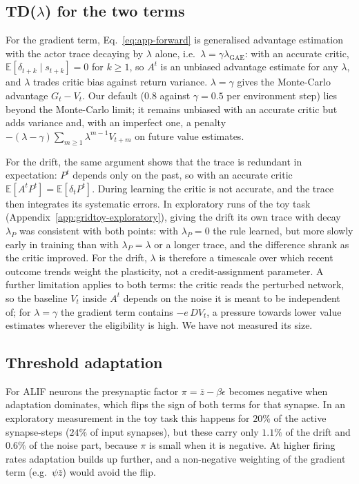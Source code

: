 \documentclass[10pt,twocolumn]{article}
\begin{document}
\subsection{TD(\texorpdfstring{$\lambda$}{lambda}) for the two terms}
\label{app:decomp-lambda}
For the gradient term, Eq.~\eqref{eq:app-forward} is generalised advantage
estimation~\citep{schulman2016gae} with the actor trace decaying by $\lambda$
alone, i.e.\ $\lambda=\gamma\lambda_{\mathrm{GAE}}$: with an accurate critic,
$\mathbb{E}[\delta_{t+k}\mid s_{t+k}]=0$ for $k\ge1$, so $A^t$ is an unbiased
advantage estimate for any $\lambda$, and $\lambda$ trades critic bias against
return variance. $\lambda=\gamma$ gives the Monte-Carlo advantage $G_t-V_t$. Our
default ($0.8$ against $\gamma=0.5$ per environment step) lies beyond the
Monte-Carlo limit; it remains unbiased with an accurate critic but adds variance
and, with an imperfect one, a penalty $-(\lambda-\gamma)\sum_{m\ge1}\lambda^{m-1}V_{t+m}$
on future value estimates.

For the drift, the same argument shows that the trace is redundant in
expectation: $P^t$ depends only on the past, so with an accurate critic
$\mathbb{E}[A^tP^t]=\mathbb{E}[\delta_tP^t]$. During learning the critic is not
accurate, and the trace then integrates its systematic errors. In exploratory runs
of the toy task (Appendix~\ref{app:gridtoy-exploratory}), giving the drift its own
trace with decay $\lambda_P$ was consistent with both points: with $\lambda_P=0$ the
rule learned, but more slowly early in training than with $\lambda_P=\lambda$ or a
longer trace, and the difference shrank as the critic improved. For the drift, $\lambda$ is
therefore a timescale over which recent outcome trends weight the plasticity,
not a credit-assignment parameter. A further limitation applies to both terms:
the critic reads the perturbed network, so the baseline $V_t$ inside $A^t$ depends
on the noise it is meant to be independent of; for $\lambda=\gamma$ the gradient
term contains $-e\,D V_t$, a pressure towards lower value estimates wherever the
eligibility is high. We have not measured its size.

\subsection{Threshold adaptation}
\label{app:decomp-adapt}
For ALIF neurons the presynaptic factor
$\pi=\bar z-\beta\epsilon$ becomes negative when adaptation dominates, which
flips the sign of both terms for that synapse. In an exploratory measurement in the toy task this happens for
$20\%$ of the active synapse-steps ($24\%$ of input synapses), but these carry
only $1.1\%$ of the drift and $0.6\%$ of the noise part, because $\pi$ is small
when it is negative. At higher firing rates adaptation builds up further, and a
non-negative weighting of the gradient term (e.g.\ $\psi\bar z$) would avoid the
flip.
\end{document}
